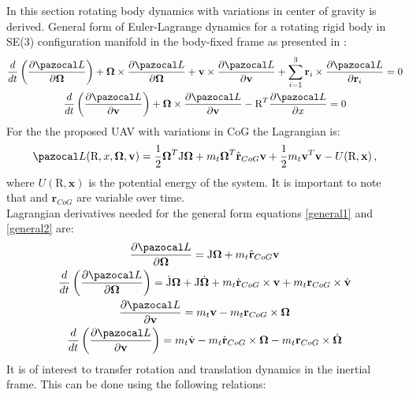 In this section rotating body dynamics with variations in center of gravity is derived.
General form of Euler-Lagrange dynamics for a rotating rigid body in SE(3) configuration manifold in the body-fixed frame as presented in \cite{LeeModel}:
\begin{gather}
	\frac{d}{dt} \left( \frac{\partial \La}{\partial \mb{\Omega}} \right)
	+ \mb{\Omega} \times \frac{\partial \La}{\partial \mb{\Omega}} 
	+ \textbf{v} \times \frac{\partial \La}{\partial \textbf{v}} 
	+ \sum_{i=1}^{3} \textbf{r}_i \times \frac{\partial \La}{\partial \textbf{r}_i} = 0 \label{general1}\\
	\frac{d}{dt} \left( \frac{\partial \La}{\partial \textbf{v}} \right)
	+ \mb{\Omega} \times \frac{\partial \La}{\partial \textbf{v}} 
	- \text{R}^T \frac{\partial \La}{\partial x} = 0 \label{general2}
\end{gather}
For the the proposed UAV with variations in CoG the Lagrangian is:
\begin{equation}
	\La(\text{R},x,\mb{\Omega},\textbf{v}) = \frac{1}{2}\mb{\Omega}^T\text{J}\mb{\Omega} + m_t \mb{\Omega}^T \hat{\textbf{r}}_{CoG}\textbf{v} + \frac{1}{2}m_t\textbf{v}^T\textbf{v} - U(\text{R},\textbf{x}) \, ,
\end{equation}
where $U(\text{R}, \textbf{x})$ is the potential energy of the system. It is important to note that  and $\textbf{r}_{CoG}$ are variable over time. \\
Lagrangian derivatives needed for the general form equations \ref{general1} and \ref{general2} are:
\begin{gather}
	\frac{\partial \La}{\partial \mb{\Omega}} = \text{J}\mb{\Omega} + m_t \hat{\textbf{r}}_{CoG}\textbf{v} \label{d1}\\ 
	\frac{d}{dt} \left( \frac{\partial \La}{\partial \mb{\Omega}} \right) = \dot{\text{J}} \mb{\Omega} + \text{J} \dot{\mb{\Omega}} + m_t \dot{\textbf{r}}_{CoG} \times \textbf{v} + m_t \textbf{r}_{CoG} \times \dot{\textbf{v}} \label{d2}\\ 
	\frac{\partial \La}{\partial \textbf{v}} = m_t\textbf{v} - m_t\textbf{r}_{CoG} \times \mb{\Omega} \label{d3}\\ 
	\frac{d}{dt} \left( \frac{\partial \La}{\partial \textbf{v}} \right) = m_t\dot{\textbf{v}} - m_t\dot{\textbf{r}}_{CoG} \times \mb{\Omega} - m_t \textbf{r}_{CoG} \times \dot{\mb{\Omega}} \label{d4}
\end{gather}
It is of interest to transfer rotation and translation dynamics in the inertial frame. This can be done using the following relations:
